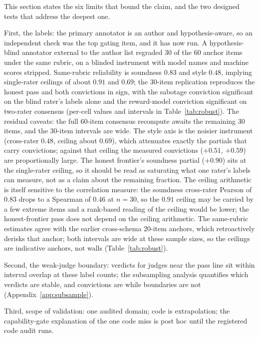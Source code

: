 This section states the six limits that bound the claim, and the two designed tests that address the deepest one.

First, the labels: the primary annotator is an author and hypothesis-aware, so an independent check was the top gating item, and it has now run.
A hypothesis-blind annotator external to the author list regraded 30 of the 60 anchor items under the same rubric, on a blinded instrument with model names and machine scores stripped.
Same-rubric reliability is soundness $0.83$ and style $0.48$, implying single-rater ceilings of about $0.91$ and $0.69$; the 30-item replication reproduces the honest pass and both convictions in sign, with the sabotage conviction significant on the blind rater's labels alone and the reward-model conviction significant on two-rater consensus (per-cell values and intervals in Table~\ref{tab:robust}).
The residual caveats: the full 60-item consensus recompute awaits the remaining 30 items, and the 30-item intervals are wide.
The style axis is the noisier instrument (cross-rater $0.48$, ceiling about $0.69$), which attenuates exactly the partials that carry convictions; against that ceiling the measured convictions ($+0.51$, $+0.59$) are proportionally large.
The honest frontier's soundness partial ($+0.90$) sits at the single-rater ceiling, so it should be read as saturating what one rater's labels can measure, not as a claim about the remaining fraction.
The ceiling arithmetic is itself sensitive to the correlation measure: the soundness cross-rater Pearson of $0.83$ drops to a Spearman of $0.46$ at $n{=}30$, so the $0.91$ ceiling may be carried by a few extreme items and a rank-based reading of the ceiling would be lower; the honest-frontier pass does not depend on the ceiling arithmetic.
The same-rubric estimates agree with the earlier cross-schema 20-item anchors, which retroactively derisks that anchor; both intervals are wide at these sample sizes, so the ceilings are indicative anchors, not walls (Table~\ref{tab:robust}).

Second, the weak-judge boundary: verdicts for judges near the pass line sit within interval overlap at these label counts; the subsampling analysis quantifies which verdicts are stable, and convictions are while boundaries are not (Appendix~\ref{app:subsample}).

Third, scope of validation: one audited domain; code is extrapolation; the capability-gate explanation of the one code miss is post hoc until the registered code audit runs.

